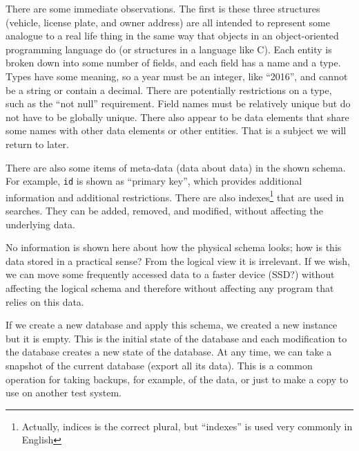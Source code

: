 There are some immediate observations. The first is these three structures (vehicle, license plate, and owner address) are all intended to represent some analogue to a real life thing in the same way that objects in an object-oriented programming language do (or structures in a language like C). Each entity is broken down into some number of fields, and each field has a name and a type. Types have some meaning, so a year must be an integer, like ``2016'', and cannot be a string or contain a decimal. There are potentially restrictions on a type, such as the ``not null'' requirement. Field names must be relatively unique but do not have to be globally unique. There also appear to be data elements that share some names with other data elements or other entities. That is a subject we will return to later.

There are also some items of meta-data (data about data) in the shown schema. For example, \texttt{id} is shown as ``primary key'', which provides additional information and additional restrictions. There are also indexes\footnote{Actually, indices is the correct plural, but ``indexes'' is used very commonly in English} that are used in searches. They can be added, removed, and modified, without affecting the underlying data.

No information is shown here about how the physical schema looks; how is this data stored in a practical sense? From the logical view it is irrelevant. If we wish, we can move some frequently accessed data to a faster device (SSD?) without affecting the logical schema and therefore without affecting any program that relies on this data. 

If we create a new database and apply this schema, we created a new instance but it is empty. This is the initial state of the database and each modification to the database creates a new state of the database. At any time, we can take a snapshot of the current database (export all its data). This is a common operation for taking backups, for example, of the data, or just to make a copy to use on another test system.

